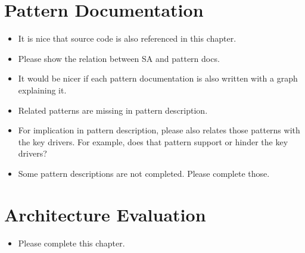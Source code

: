 \documentclass[a4paper,10pt]{article}
\begin{document}
\section{Pattern Documentation}
\begin{itemize}
	\item It is nice that source code is also referenced in this chapter.
	\item Please show the relation between SA and pattern docs.
	\item It would be nicer if each pattern documentation is also written with a graph explaining it.
	\item Related patterns are missing in pattern description.
	\item For implication in pattern description, please also relates those patterns with the key drivers. For example, does that pattern support or hinder the key drivers?
	\item Some pattern descriptions are not completed. Please complete those.
\end{itemize}

\section{Architecture Evaluation}
\begin{itemize}
	\item Please complete this chapter.
\end{itemize}
\end{document}
